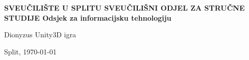 \begin{titlepage}


\bfseries
\headerdata
{SVEUČILIŠTE U SPLITU}
{SVEUČILIŠNI ODJEL ZA STRUČNE STUDIJE}
{Odsjek za informacijsku tehnologiju}

\vspace*{4cm}
\begin{center}

\vspace*{3cm}

\vspace*{0.5cm}
\Huge Dionyzus Unity3D igra

\end{center}
\begin{center}
\vfill
{\large Split, \today}
\end{center}
\end{titlepage}
